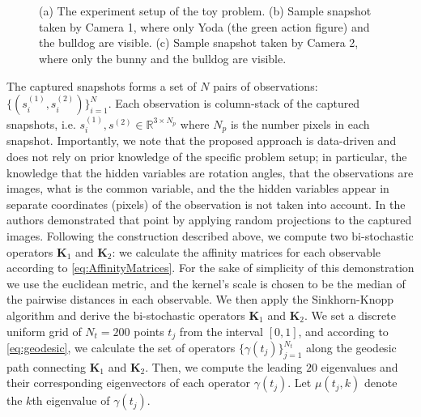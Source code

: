 \documentclass[]{article}
\theoremstyle{definition}
\begin{document}
	\begin{figure}[t]%
		\centering
		 \\
		\hspace{1cm} \\
		\caption{(a) The experiment setup of the toy problem. (b) Sample snapshot
			taken by Camera 1, where only Yoda (the green action figure) and the
			bulldog are visible. (c) Sample snapshot taken by Camera 2, where only the
			bunny and the bulldog are visible.}%
		\label{fig:Puppets_Setup}%
	\end{figure}

The captured snapshots forms a set of $N$ pairs of observations: $\{(s^{(1)}_i,s^{(2)}_i)\}_{i=1}^N$. Each observation is column-stack of the captured snapshots, i.e. $s^{(1)}_i,s^{(2)} \in \mathbb{R}^{3 \times N_p}$ where $N_p$ is the number pixels in each snapshot.
%
Importantly, we note that the proposed approach is data-driven and does not rely on prior knowledge of the specific problem setup; in particular, the knowledge that the hidden variables are rotation angles, that the observations are images, what is the common variable, and the the hidden variables appear in separate coordinates (pixels) of the observation is not taken into account. In \cite{lederman2018learning} the authors demonstrated that point by applying random projections to the captured images.
%
Following the construction described above, we compute two bi-stochastic operators $\mathbf{K}_1$ and $\mathbf{K}_2$: we calculate the affinity matrices for each observable according to \ref{eq:AffinityMatrices}. For the sake of simplicity of this demonstration we use the euclidean metric, and the kernel's scale is chosen to be the median of the pairwise distances in each observable. We then apply the 
Sinkhorn-Knopp algorithm \cite{knight2008sinkhorn} and derive the bi-stochastic operators $\mathbf{K}_1$ and $\mathbf{K}_2$.
%
We set a discrete uniform grid of $N_t=200$ points $t_j$ from the interval $[0,1]$, and according to \eqref{eq:geodesic}, we calculate the set of operators $\{\gamma(t_j)\}_{j=1}^{N_t}$ along the geodesic path connecting $\mathbf{K}_1$ and $\mathbf{K}_2$. 
%
Then, we compute the leading $20$ eigenvalues and their corresponding eigenvectors of each operator $\gamma(t_j)$. 
Let $\mu(t_j,k)$ denote the $k$th eigenvalue of $\gamma(t_j)$.
\end{document}
